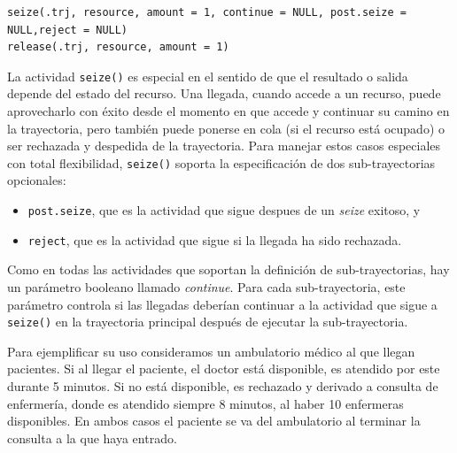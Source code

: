 \documentclass[
]{book}
\providecommand{\tightlist}{%
  \setlength{\itemsep}{0pt}\setlength{\parskip}{0pt}}
\theoremstyle{definition}
\theoremstyle{definition}
\theoremstyle{definition}
\theoremstyle{definition}
\theoremstyle{remark}
\begin{document}
\begin{verbatim}
seize(.trj, resource, amount = 1, continue = NULL, post.seize = NULL,reject = NULL)
release(.trj, resource, amount = 1)
\end{verbatim}

La actividad \texttt{seize()} es especial en el sentido de que el resultado o salida depende del estado del recurso. Una llegada, cuando accede a un recurso, puede aprovecharlo con éxito desde el momento en que accede y continuar su camino en la trayectoria, pero también puede ponerse en cola (si el recurso está ocupado) o ser rechazada y despedida de la trayectoria. Para manejar estos casos especiales con total flexibilidad, \texttt{seize()} soporta la especificación de dos sub-trayectorias opcionales:

\begin{itemize}
\tightlist
\item
  \texttt{post.seize}, que es la actividad que sigue despues de un \emph{seize} exitoso, y
\item
  \texttt{reject}, que es la actividad que sigue si la llegada ha sido rechazada.
\end{itemize}

Como en todas las actividades que soportan la definición de sub-trayectorias, hay un parámetro booleano llamado \emph{continue}. Para cada sub-trayectoria, este parámetro controla si las llegadas deberían continuar a la actividad que sigue a \texttt{seize()} en la trayectoria principal después de ejecutar la sub-trayectoria.

Para ejemplificar su uso consideramos un ambulatorio médico al que llegan pacientes. Si al llegar el paciente, el doctor está disponible, es atendido por este durante 5 minutos. Si no está disponible, es rechazado y derivado a consulta de enfermería, donde es atendido siempre 8 minutos, al haber 10 enfermeras disponibles. En ambos casos el paciente se va del ambulatorio al terminar la consulta a la que haya entrado.
\end{document}
